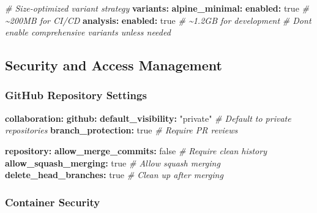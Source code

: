 \documentclass[
]{article}
\newenvironment{Shaded}{\begin{snugshade}}{\end{snugshade}}
\newcommand{\AttributeTok}[1]{\textcolor[rgb]{0.13,0.29,0.53}{#1}}
\newcommand{\CharTok}[1]{\textcolor[rgb]{0.31,0.60,0.02}{#1}}
\newcommand{\CommentTok}[1]{\textcolor[rgb]{0.56,0.35,0.01}{\textit{#1}}}
\newcommand{\FunctionTok}[1]{\textcolor[rgb]{0.13,0.29,0.53}{\textbf{#1}}}
\newcommand{\KeywordTok}[1]{\textcolor[rgb]{0.13,0.29,0.53}{\textbf{#1}}}
\newcommand{\StringTok}[1]{\textcolor[rgb]{0.31,0.60,0.02}{#1}}
\begin{document}
\begin{Shaded}
\begin{Highlighting}[]
\CommentTok{\# Size{-}optimized variant strategy}
\FunctionTok{variants}\KeywordTok{:}
\AttributeTok{  }\FunctionTok{alpine\_minimal}\KeywordTok{:}
\AttributeTok{    }\FunctionTok{enabled}\KeywordTok{:}\AttributeTok{ }\CharTok{true}\CommentTok{     \# \textasciitilde{}200MB for CI/CD}
\AttributeTok{  }\FunctionTok{analysis}\KeywordTok{:}
\AttributeTok{    }\FunctionTok{enabled}\KeywordTok{:}\AttributeTok{ }\CharTok{true}\CommentTok{     \# \textasciitilde{}1.2GB for development}
\CommentTok{  \# Don\textquotesingle{}t enable comprehensive variants unless needed}
\end{Highlighting}
\end{Shaded}

\subsection{Security and Access
Management}\label{security-and-access-management}

\subsubsection{GitHub Repository
Settings}\label{github-repository-settings}

\begin{Shaded}
\begin{Highlighting}[]
\FunctionTok{collaboration}\KeywordTok{:}
\AttributeTok{  }\FunctionTok{github}\KeywordTok{:}
\AttributeTok{    }\FunctionTok{default\_visibility}\KeywordTok{:}\AttributeTok{ }\StringTok{"private"}\CommentTok{    \# Default to private repositories}
\AttributeTok{    }\FunctionTok{branch\_protection}\KeywordTok{:}\AttributeTok{ }\CharTok{true}\CommentTok{          \# Require PR reviews}

\AttributeTok{    }\FunctionTok{repository}\KeywordTok{:}
\AttributeTok{      }\FunctionTok{allow\_merge\_commits}\KeywordTok{:}\AttributeTok{ }\CharTok{false}\CommentTok{     \# Require clean history}
\AttributeTok{      }\FunctionTok{allow\_squash\_merging}\KeywordTok{:}\AttributeTok{ }\CharTok{true}\CommentTok{     \# Allow squash merging}
\AttributeTok{      }\FunctionTok{delete\_head\_branches}\KeywordTok{:}\AttributeTok{ }\CharTok{true}\CommentTok{     \# Clean up after merging}
\end{Highlighting}
\end{Shaded}

\subsubsection{Container Security}\label{container-security}
\end{document}
